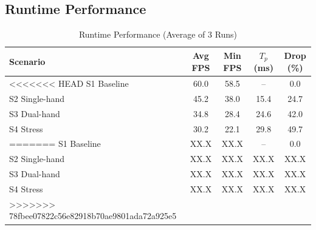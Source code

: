 \documentclass[journal,onecolumn,12pt,draftclsnofoot]{IEEEtran}
\begin{document}
\begin{itemize}
\subsection{Runtime Performance}
\begin{table}[htbp]
\caption{Runtime Performance (Average of 3 Runs)}
\centering
\begin{tabular}{|l|c|c|c|c|}
\hline
\textbf{Scenario} & \textbf{Avg FPS} & \textbf{Min FPS} & \textbf{$T_p$ (ms)} & \textbf{Drop (\%)} \\
\hline
<<<<<<< HEAD
S1 Baseline    & 60.0 & 58.5 & --   & 0.0 \\
S2 Single-hand & 45.2 & 38.0 & 15.4 & 24.7 \\
S3 Dual-hand   & 34.8 & 28.4 & 24.6 & 42.0 \\
S4 Stress      & 30.2 & 22.1 & 29.8 & 49.7 \\
=======
S1 Baseline    & XX.X & XX.X & --   & 0.0 \\
S2 Single-hand & XX.X & XX.X & XX.X & XX.X \\
S3 Dual-hand   & XX.X & XX.X & XX.X & XX.X \\
S4 Stress      & XX.X & XX.X & XX.X & XX.X \\
>>>>>>> 78fbee07822c56e82918b70ae9801ada72a925e5
\hline
\end{tabular}
\label{tab:results}
\end{table}


\end{itemize}
\end{document}
